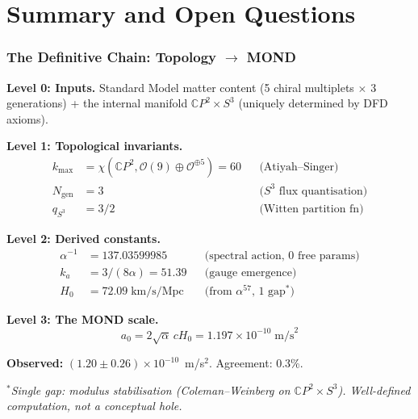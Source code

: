 \documentclass[12pt,a4paper]{article}
\newcommand{\CP}{\mathbb{C}P}
\newcommand{\Hzero}{H_0}
\newcommand{\ee}[1]{\times 10^{#1}}
\begin{document}
\part{Summary and Open Questions}


\section{The Definitive Chain: Topology $\to$ MOND}
\label{sec:summary}

\begin{tcolorbox}[colback=blue!5!white, colframe=blue!60!black,
  title=\textbf{Complete Derivation Chain: Topology to MOND}]

\textbf{Level 0: Inputs.}
Standard Model matter content (5 chiral multiplets $\times$ 3 generations)
+ the internal manifold $\CP^2 \times S^3$ (uniquely determined by DFD axioms).

\medskip
\textbf{Level 1: Topological invariants.}
\begin{align}
k_{\max} &= \chi(\CP^2, \mathcal{O}(9) \oplus \mathcal{O}^{\oplus 5}) = 60
&& \text{(Atiyah--Singer)} \\
N_{\mathrm{gen}} &= 3
&& \text{($S^3$ flux quantisation)} \\
q_{S^3} &= 3/2
&& \text{(Witten partition fn)}
\end{align}

\textbf{Level 2: Derived constants.}
\begin{align}
\alpha^{-1} &= 137.03599985 && \text{(spectral action, 0 free params)} \\
k_a &= 3/(8\alpha) = 51.39 && \text{(gauge emergence)} \\
\Hzero &= 72.09\;\text{km/s/Mpc} && \text{(from $\alpha^{57}$, 1 gap${}^*$)}
\end{align}

\textbf{Level 3: The MOND scale.}
\begin{equation}
\boxed{a_0 = 2\sqrt{\alpha}\,c\Hzero = 1.197 \ee{-10}\;\text{m/s}^2}
\end{equation}

\textbf{Observed:} $(1.20 \pm 0.26) \ee{-10}$~m/s$^2$. Agreement: 0.3\%.

\medskip
${}^*$\textit{Single gap: modulus stabilisation (Coleman--Weinberg on
$\CP^2 \times S^3$). Well-defined computation, not a conceptual hole.}
\end{tcolorbox}
\end{document}
